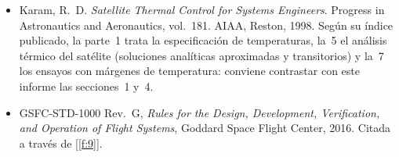 \documentclass[11pt,a4paper]{article}
\newcommand{\f}[1]{\ref{f:#1}}
\begin{document}
{\small
\begin{itemize}
  \item Karam, R.~D. \textit{Satellite Thermal Control for Systems Engineers}. Progress in Astronautics and Aeronautics, vol.~181. AIAA, Reston, 1998. Según su índice publicado, la parte~1 trata la especificación de temperaturas, la~5 el análisis térmico del satélite (soluciones analíticas aproximadas y transitorios) y la~7 los ensayos con márgenes de temperatura: conviene contrastar con este informe las secciones~1 y~4.
  \item GSFC-STD-1000 Rev.~G, \textit{Rules for the Design, Development, Verification, and Operation of Flight Systems}, Goddard Space Flight Center, 2016. Citada a través de [\f{9}].
\end{itemize}
}
\end{document}
